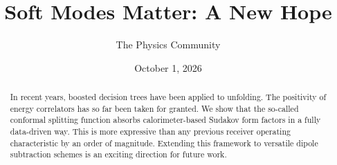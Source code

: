 \documentclass[11pt]{article}
\title{Soft Modes Matter: A New Hope}
\author{The Physics Community}
\date{October 1, 2026}
\numberwithin{equation}{section}
\theoremstyle{definition}
\theoremstyle{remark}
\begin{document}
\maketitle
\begin{abstract}
In recent years, boosted decision trees have been applied to unfolding.
The positivity of energy correlators has so far been taken for granted.
We show that the so-called conformal splitting function absorbs
calorimeter-based Sudakov form factors in a fully data-driven way. This
is more expressive than any previous receiver operating characteristic
by an order of magnitude. Extending this framework to versatile dipole
subtraction schemes is an exciting direction for future work.
\end{abstract}
\tableofcontents






\nocite{*}


\end{document}
